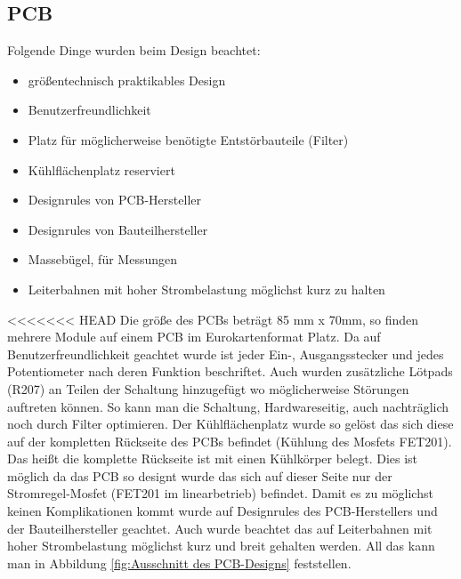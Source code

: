 \documentclass[paper=a4, 12pt]{scrreprt}
\begin{document}
		\subsection{PCB}\hfill \break
		Folgende Dinge wurden beim Design beachtet:
		\hfill \break 
		\begin{center}
			\begin{minipage}{0.5\textwidth}
				\begin{itemize}
					\item größentechnisch praktikables Design 
					\item Benutzerfreundlichkeit
					\item Platz für möglicherweise benötigte Entstörbauteile (Filter)
					\item Kühlflächenplatz reserviert
					\item Designrules von PCB-Hersteller
					\item Designrules von Bauteilhersteller
					\item Massebügel, für Messungen
					\item Leiterbahnen mit hoher Strombelastung möglichst kurz zu halten
				\end{itemize}
			\end{minipage}
		\end{center}
		\hfill \break
<<<<<<< HEAD
		Die größe des PCBs beträgt 85 mm x 70mm, so finden mehrere Module auf einem PCB im Eurokartenformat Platz. Da auf Benutzerfreundlichkeit geachtet wurde ist jeder Ein-, Ausgangsstecker und jedes Potentiometer nach deren Funktion beschriftet. Auch wurden zusätzliche Lötpads (R207) an Teilen der Schaltung hinzugefügt wo möglicherweise Störungen auftreten können. So kann man die Schaltung, Hardwareseitig, auch nachträglich noch durch Filter optimieren. Der Kühlflächenplatz wurde so gelöst das sich diese auf der kompletten Rückseite des PCBs befindet (Kühlung des Mosfets FET201). Das heißt die komplette Rückseite ist mit einen Kühlkörper belegt. Dies ist möglich da das PCB so designt wurde das sich auf dieser Seite nur der Stromregel-Mosfet (FET201 im linearbetrieb) befindet. Damit es zu möglichst keinen Komplikationen kommt wurde auf Designrules des PCB-Herstellers und der Bauteilhersteller geachtet. Auch wurde beachtet das auf Leiterbahnen mit hoher Strombelastung möglichst kurz und breit gehalten werden. All das kann man in Abbildung \ref{fig:Ausschnitt des PCB-Designs} feststellen.\hfill \break 
	\newpage
\end{document}
